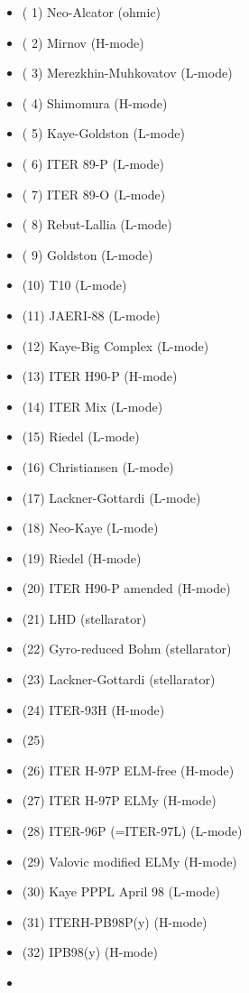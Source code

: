 \documentclass[]{article}
\providecommand{\tightlist}{%
  \setlength{\itemsep}{0pt}\setlength{\parskip}{0pt}}
\begin{document}
\begin{itemize}
  \begin{itemize}
  \tightlist
  \item
    ( 1) Neo-Alcator (ohmic)
  \item
    ( 2) Mirnov (H-mode)
  \item
    ( 3) Merezkhin-Muhkovatov (L-mode)
  \item
    ( 4) Shimomura (H-mode)
  \item
    ( 5) Kaye-Goldston (L-mode)
  \item
    ( 6) ITER 89-P (L-mode)
  \item
    ( 7) ITER 89-O (L-mode)
  \item
    ( 8) Rebut-Lallia (L-mode)
  \item
    ( 9) Goldston (L-mode)
  \item
    (10) T10 (L-mode)
  \item
    (11) JAERI-88 (L-mode)
  \item
    (12) Kaye-Big Complex (L-mode)
  \item
    (13) ITER H90-P (H-mode)
  \item
    (14) ITER Mix (L-mode)
  \item
    (15) Riedel (L-mode)
  \item
    (16) Christiansen (L-mode)
  \item
    (17) Lackner-Gottardi (L-mode)
  \item
    (18) Neo-Kaye (L-mode)
  \item
    (19) Riedel (H-mode)
  \item
    (20) ITER H90-P amended (H-mode)
  \item
    (21) LHD (stellarator)
  \item
    (22) Gyro-reduced Bohm (stellarator)
  \item
    (23) Lackner-Gottardi (stellarator)
  \item
    (24) ITER-93H (H-mode)
  \item
    (25)
  \item
    (26) ITER H-97P ELM-free (H-mode)
  \item
    (27) ITER H-97P ELMy (H-mode)
  \item
    (28) ITER-96P (=ITER-97L) (L-mode)
  \item
    (29) Valovic modified ELMy (H-mode)
  \item
    (30) Kaye PPPL April 98 (L-mode)
  \item
    (31) ITERH-PB98P(y) (H-mode)
  \item
    (32) IPB98(y) (H-mode)
  \item

\end{itemize}
\end{itemize}
\end{document}
